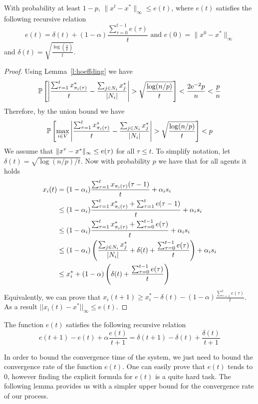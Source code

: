 \begin{lemma}
With probability at least $1-p$, $\|x^t - x^*\|_{\infty} \leq e(t)$, where $e(t)$ satisfies the following recursive relation
$$e(t) = \delta(t) + (1-\alpha)\frac{\sum_{\tau=0}^{t-1}e(\tau)}{t} \text{ and } e(0)=\|x^0 - x^*\|_{\infty}$$
and $\delta(t)=\sqrt{\frac{\log(\frac{n}{p})}{t}}$.
\end{lemma}
\begin{proof}
Using Lemma~\ref{l:hoeffding} we have
\[
  \mathbb{P}\left[
    \left|
    \frac{\sum_{\tau = 1}^{t} x^*_{\pi_i(\tau)}}{t}
    - \frac{\sum_{j \in N_i} x^*_j}{|N_i|} \right|
    > \sqrt{
      \frac{\log(n/p)}{t}
    }
  \right] < \frac{2 \mathrm{e}^{-2} p}{n} < \frac{p}{n}
\]
Therefore, by the union bound we have
\[
  \mathbb{P}\left[
    \max_{i \in V}
    \left|
    \frac{\sum_{\tau = 1}^{t} x^*_{\pi_i(\tau)}}{t}
    - \frac{\sum_{j \in N_i} x^*_j}{|N_i|} \right|
    > \sqrt{
      \frac{\log(n/p)}{t} }
  \right] < p
\]
We assume that $\| x^{\tau}-x^* \|_{\infty} \leq e(\tau)$ for all $\tau \leq t$.
To simplify notation, let $\delta(t) =
\sqrt{ \log(n/p)/t} $.
Now with probability $p$ we have that for all agents it holds
\begin{align*}
x_i(t)
&= (1-\alpha_i)\frac{\sum_{\tau=1}^{t}x_{\pi_i(\tau)}(\tau-1)}{t} + \alpha_i s_i\\
&\leq (1-\alpha_i)\frac{\sum_{\tau=1}^{t}x^*_{\pi_i(\tau)} + \sum_{\tau=1}^{t} e(\tau-1)}{t} + \alpha_i s_i\\
&\leq (1-\alpha_i)\frac{\sum_{\tau=1}^{t}x^*_{\pi_i(\tau)} + \sum_{\tau=0}^{t-1} e(\tau)}{t} + \alpha_i s_i\\
&\leq  (1-\alpha_i)\left(\frac{\sum_{j \in N_i}x^*_{j}}{|N_i|} + \delta(t) + \frac{\sum_{\tau=0}^{t-1} e(\tau)}{t} \right) + \alpha_i s_i\\
&\leq x_i^* + (1-\alpha) \left(\delta(t) + \frac{\sum_{\tau=0}^{t-1} e(\tau)}{t} \right)
\end{align*}
Equivalently, we can prove that $x_i(t+1) \geq x_i^* - \delta(t) - (1-\alpha)\frac{\sum_{\tau=1}^t e(\tau)}{t}$.
As a result $||x_i(t)-x^*||_{\infty} \leq e(t)$.
\end{proof}

\begin{corollary}
The function $e(t)$ satisfies the following recursive relation
$$e(t+1)-e(t) + \alpha \frac{e(t)}{t+1}=\delta(t+1)-\delta(t) + \frac{\delta(t)}{t+1}$$
\end{corollary}
In order to bound the convergence time of the system, we just need to bound the convergence rate of the function $e(t)$. One can easily prove that $e(t)$ tends to $0$, however finding the explicit formula for $e(t)$ is a quite hard task. The following lemma provides us with a simpler upper bound for the convergence rate of our process.

